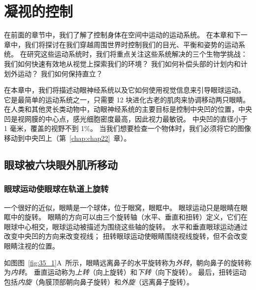 \chapter{凝视的控制} \label{chap:chap35}

在前面的章节中，我们了解了控制身体在空间中运动的运动系统。
在本章和下一章中，我们将探讨在我们穿越周围世界时控制我们的目光、平衡和姿势的运动系统。
在研究这些运动系统时，我们将重点关注这些系统解决的三个生物学挑战：
我们如何快速有效地从视觉上探索我们的环境？
我们如何补偿头部的计划内和计划外运动？
我们如何保持直立？


在本章中，我们将描述动眼神经系统以及它如何使用视觉信息来引导眼球运动。
它是最简单的运动系统之一，只需要 12 块进化古老的肌肉来协调移动两只眼睛。
在人类和其他灵长类动物中，动眼神经系统的主要目标是控制中央凹的位置，中央凹是视网膜的中心点，感光细胞密度最高，因此视力最敏锐。
中央凹的直径小于 1 毫米，覆盖的视野不到 1\%。
当我们想要检查一个物体时，我们必须将它的图像移动到中央凹上（第~\ref{chap:chap22}~章）。



\section{眼球被六块眼外肌所移动}

\subsection{眼球运动使眼球在轨道上旋转}

一个很好的近似，眼睛是一个球体，位于眼窝，眼眶中。
眼球运动只是眼睛在眼眶中的旋转。
眼睛的方向可以由三个旋转轴（水平、垂直和扭转）定义，它们在眼球中心相交，眼球运动被描述为围绕这些轴的旋转。
水平和垂直眼球运动通过改变中央凹的方向来改变视线；
扭转眼球运动使眼睛围绕视线旋转，但不会改变眼睛注视的位置。


如图图~\ref{fig:35_1}A~所示，眼睛远离鼻子的水平旋转称为\textit{外转}，朝向鼻子的旋转称为\textit{内转}。 
垂直运动称为\textit{上转}（向上旋转）和\textit{下转}（向下旋转）。
最后，扭转运动包括\textit{内旋}（角膜顶部朝向鼻子旋转）和\textit{外旋}（远离鼻子旋转）。


